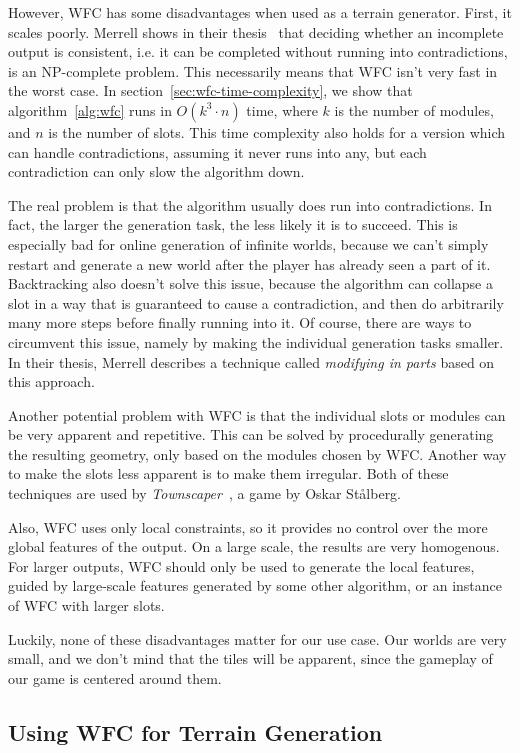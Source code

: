However, WFC has some disadvantages when used as a terrain generator.
First, it scales poorly.
Merrell shows in their thesis~\cite{ModelSynthesis} that deciding whether an incomplete output is consistent, i.e. it can be completed without running into contradictions, is an NP-complete problem.
This necessarily means that WFC isn't very fast in the worst case.
In section~\ref{sec:wfc-time-complexity}, we show that algorithm~\ref{alg:wfc} runs in $O(k^3 \cdot n)$ time, where $k$ is the number of modules, and $n$ is the number of slots.
This time complexity also holds for a version which can handle contradictions, assuming it never runs into any, but each contradiction can only slow the algorithm down.

The real problem is that the algorithm usually does run into contradictions.
In fact, the larger the generation task, the less likely it is to succeed.
This is especially bad for online generation of infinite worlds, because we can't simply restart and generate a new world after the player has already seen a part of it.
Backtracking also doesn't solve this issue, because the algorithm can collapse a slot in a way that is guaranteed to cause a contradiction, and then do arbitrarily many more steps before finally running into it.
Of course, there are ways to circumvent this issue, namely by making the individual generation tasks smaller.
In their thesis, Merrell describes a technique called \emph{modifying in parts} based on this approach.

Another potential problem with WFC is that the individual slots or modules can be very apparent and repetitive.
This can be solved by procedurally generating the resulting geometry, only based on the modules chosen by WFC.
Another way to make the slots less apparent is to make them irregular.
Both of these techniques are used by \emph{Townscaper}~\cite{Townscaper}, a game by Oskar St\r{a}lberg.

Also, WFC uses only local constraints, so it provides no control over the more global features of the output.
On a large scale, the results are very homogenous.
For larger outputs, WFC should only be used to generate the local features, guided by large-scale features generated by some other algorithm, or an instance of WFC with larger slots.

Luckily, none of these disadvantages matter for our use case.
Our worlds are very small, and we don't mind that the tiles will be apparent, since the gameplay of our game is centered around them.

\subsection{Using WFC for Terrain Generation}

